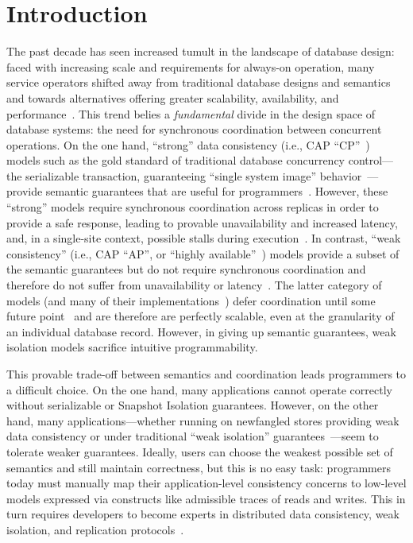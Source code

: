 
\section{Introduction}
\label{sec:intro}

The past decade has seen increased tumult in the landscape of database
design: faced with increasing scale and requirements for always-on
operation, many service operators shifted away from traditional
database designs and semantics and towards alternatives offering
greater scalability, availability, and
performance~\cite{dynamo,bigtable,cassandra,brewer-base}. This trend
belies a \textit{fundamental} divide in the design space of database
systems: the need for synchronous coordination between concurrent
operations. On the one hand, ``strong'' data consistency (i.e., CAP
``CP''~\cite{gilbert-cap}) models such as the gold standard of
traditional database concurrency control---the serializable
transaction, guaranteeing ``single system image''
behavior~\cite{gray-virtues}---provide semantic guarantees that are
useful for programmers~\cite{bernstein-book}. However, these
``strong'' models require synchronous coordination across replicas in
order to provide a safe response, leading to provable unavailability
and increased latency, and, in a single-site context, possible stalls
during execution~\cite{pacelc}. In contrast, ``weak consistency''
(i.e., CAP ``AP'', or ``highly available''~\cite{gilbert-cap}) models
provide a subset of the semantic guarantees but do not require
synchronous coordination and therefore do not suffer from
unavailability or latency~\cite{hat-vldb}. The latter category of
models (and many of their implementations~\cite{swift}) defer
coordination until some future point~\cite{calm,consistency-borders}
and are therefore are perfectly scalable, even at the granularity of
an individual database record. However, in giving up semantic
guarantees, weak isolation models sacrifice intuitive programmability.

This provable trade-off between semantics and coordination leads
programmers to a difficult choice. On the one hand, many applications
cannot operate correctly without serializable or Snapshot Isolation
guarantees. However, on the other hand, many applications---whether
running on newfangled stores providing weak data consistency or under
traditional ``weak isolation'' guarantees~\cite{adya-isolation}---seem
to tolerate weaker guarantees. Ideally, users can choose the weakest
possible set of semantics and still maintain correctness, but this is
no easy task: programmers today must manually map their
application-level consistency concerns to low-level models expressed
via constructs like admissible traces of reads and writes. This in
turn requires developers to become experts in distributed data
consistency, weak isolation, and replication
protocols~\cite{consistency-borders}.

